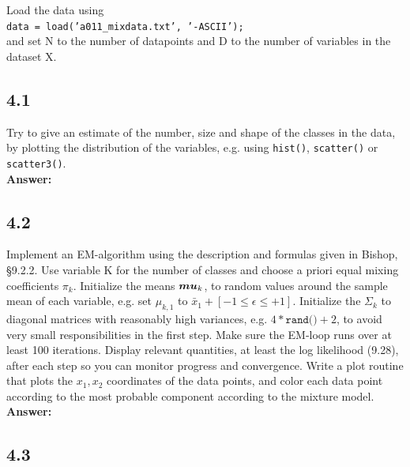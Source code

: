 \documentclass[a4paper]{article}
\begin{document}
Load the data using\\

\hspace{1cm} \texttt{data = load('a011\_mixdata.txt', '-ASCII');}\\

and set N to the number of datapoints and D to the number of variables in the dataset X.

\subsection*{4.1}

Try to give an estimate of the number, size and shape of the classes in the data, by plotting the distribution of the variables, e.g. using \texttt{hist()}, \texttt{scatter()} or \texttt{scatter3()}.\\

\textbf{Answer:}\\






\subsection*{4.2}

Implement an EM-algorithm using the description and formulas given in Bishop, §9.2.2. Use variable K for the number of classes and choose a priori equal mixing coefficients $\pi_k$. Initialize the means $\boldsymbol{\\mu}_k$, to random values around the sample mean of each variable, e.g. set $\mu_{k,1}$ to  $\bar{x}_1 + [-1 \leq \epsilon \leq +1]$. Initialize the $\Sigma_k$ to diagonal matrices with reasonably high variances, e.g. $4*\texttt{rand()}+2$, to avoid very small responsibilities in the first step. Make sure the EM-loop runs over at least 100 iterations. Display relevant quantities, at least the log likelihood (9.28), after each step so you can monitor progress and convergence. Write a plot routine that plots the $x_1, x_2$ coordinates of the data points, and color each data point according to the most probable component according to the mixture model.\\

\textbf{Answer:}\\






\subsection*{4.3}
\end{document}
